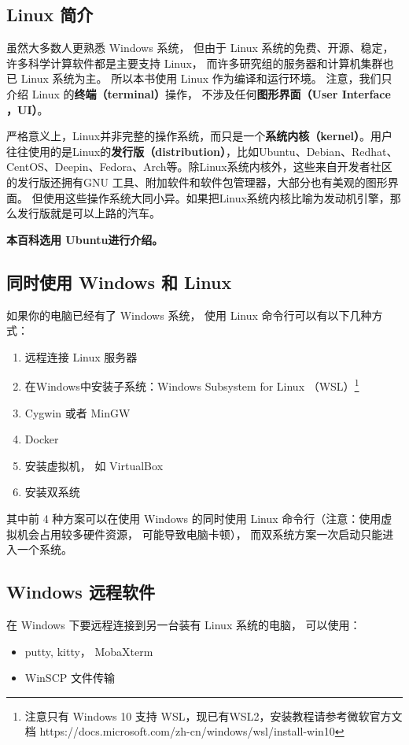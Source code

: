 
\begin{issues}
\issueTODO
\end{issues}

\subsection{Linux 简介}
虽然大多数人更熟悉 Windows 系统， 但由于 Linux 系统的免费、开源、稳定， 许多科学计算软件都是主要支持 Linux， 而许多研究组的服务器和计算机集群也已 Linux 系统为主。 所以本书使用 Linux 作为编译和运行环境。 注意，我们只介绍 Linux 的\textbf{终端（terminal）}操作， 不涉及任何\textbf{图形界面（User Interface ，UI）}。 

严格意义上，Linux并非完整的操作系统，而只是一个\textbf{系统内核（kernel）}。用户往往使用的是Linux的\textbf{发行版（distribution）}，比如Ubuntu、Debian、Redhat、CentOS、Deepin、Fedora、Arch等。除Linux系统内核外，这些来自开发者社区的发行版还拥有GNU 工具、附加软件和软件包管理器，大部分也有美观的图形界面。 但使用这些操作系统大同小异。如果把Linux系统内核比喻为发动机引擎，那么发行版就是可以上路的汽车。

\textbf{本百科选用 Ubuntu进行介绍。}


\subsection{同时使用 Windows 和 Linux}
如果你的电脑已经有了 Windows 系统， 使用 Linux 命令行可以有以下几种方式：
\begin{enumerate}
\item 远程连接 Linux 服务器
\item 在Windows中安装子系统：Windows Subsystem for Linux （WSL）\footnote{注意只有 Windows 10 支持 WSL，现已有WSL2，安装教程请参考微软官方文档 https://docs.microsoft.com/zh-cn/windows/wsl/install-win10} 
\item Cygwin 或者 MinGW
\item Docker
\item 安装虚拟机， 如 VirtualBox
\item 安装双系统
\end{enumerate}
其中前 4 种方案可以在使用 Windows 的同时使用 Linux 命令行（注意：使用虚拟机会占用较多硬件资源， 可能导致电脑卡顿）， 而双系统方案一次启动只能进入一个系统。

\subsection{Windows 远程软件}
在 Windows 下要远程连接到另一台装有 Linux 系统的电脑， 可以使用：
\begin{itemize}
\item putty, kitty， MobaXterm
\item WinSCP 文件传输
\end{itemize}


